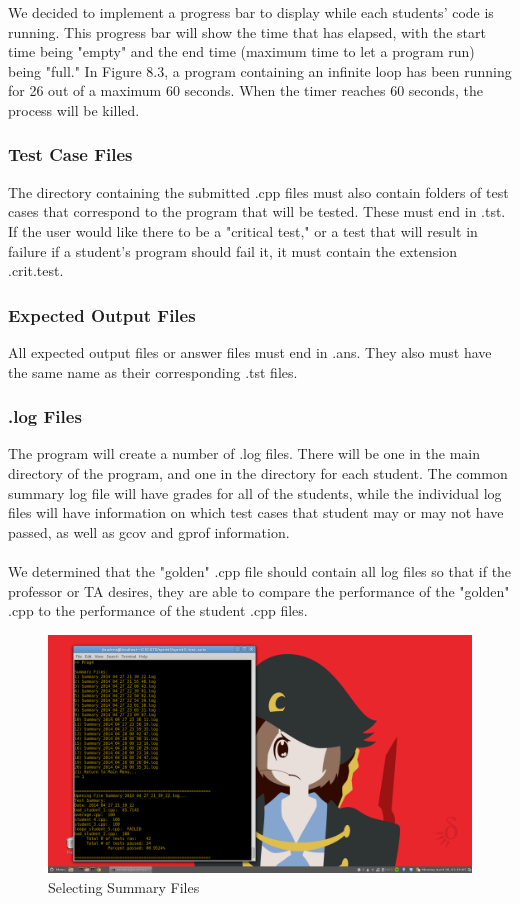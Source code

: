 \documentclass {article}
\begin{document}
			We decided to implement a progress bar to display while each students' code is running.
			 This progress bar will show the time that has elapsed, with the start time being
			 "empty" and the end time (maximum time to let a program run) being "full." In
			 Figure 8.3, a program containing an infinite loop has been running for 26 out of a 
			 maximum 60 seconds. When the timer reaches 60 seconds, the process will be killed.
			 
			 			 
		\subsubsection{\large{\color{cyan}Test Case Files}}
			The directory containing the submitted .cpp files must also contain folders of test
			 cases that correspond to the program that will be tested. These must end in .tst.
			 If the user would like there to be a "critical test," or a test that will result in
			 failure if a student's program should fail it, it must contain the extension
			 .crit.test.
		 
		\subsubsection{\large{\color{cyan}Expected Output Files}}
			All expected output files or answer files must end in .ans. They also must have the
			 same name as their corresponding .tst files.
			 
		\subsubsection{\large{\color{cyan}.log Files}}
			The program will create a number of .log files. There will be one in the main
			 directory of the program, and one in the directory for each student. The common
			 summary log file will have grades for all of the students, while the individual
			 log files will have information on which test cases that student may or may not have
			 passed, as well as gcov and gprof information.\\ \ \\We determined that the "golden" 
			 .cpp file should contain all log files so that if the professor or TA desires, they
			 are able to compare the performance of the "golden" .cpp to the performance of the
			 student .cpp files.
			 
			\begin{figure}[h!]
				\centering
				\includegraphics[width=0.6\linewidth]{viewsumm.png}
				\caption{Selecting Summary Files}
				\label{fig:Summary_files}
			\end{figure}
			 
\end{document}
